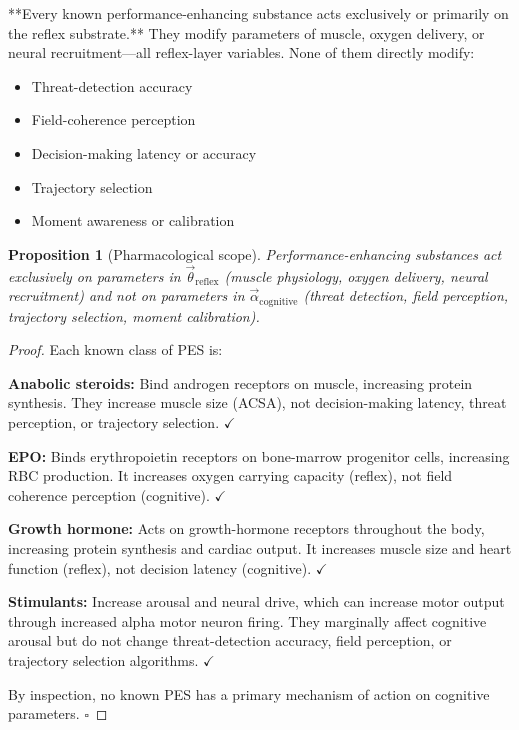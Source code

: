 \documentclass[11pt,twocolumn]{article}
\newtheorem{proposition}[theorem]{Proposition}
\theoremstyle{definition}
\theoremstyle{remark}
\begin{document}
**Every known performance-enhancing substance acts exclusively or primarily on the reflex substrate.** They modify parameters of muscle, oxygen delivery, or neural recruitment—all reflex-layer variables. None of them directly modify:
\begin{itemize}[leftmargin=1.2em]
\item Threat-detection accuracy
\item Field-coherence perception
\item Decision-making latency or accuracy
\item Trajectory selection
\item Moment awareness or calibration
\end{itemize}

\begin{proposition}[Pharmacological scope]
\label{prop:pharm-scope}
Performance-enhancing substances act exclusively on parameters in $\vec{\theta}_{\text{reflex}}$ (muscle physiology, oxygen delivery, neural recruitment) and not on parameters in $\vec{\alpha}_{\text{cognitive}}$ (threat detection, field perception, trajectory selection, moment calibration).
\end{proposition}

\begin{proof}
Each known class of PES is:

\textbf{Anabolic steroids:} Bind androgen receptors on muscle, increasing protein synthesis. They increase muscle size (ACSA), not decision-making latency, threat perception, or trajectory selection. $\checkmark$

\textbf{EPO:} Binds erythropoietin receptors on bone-marrow progenitor cells, increasing RBC production. It increases oxygen carrying capacity (reflex), not field coherence perception (cognitive). $\checkmark$

\textbf{Growth hormone:} Acts on growth-hormone receptors throughout the body, increasing protein synthesis and cardiac output. It increases muscle size and heart function (reflex), not decision latency (cognitive). $\checkmark$

\textbf{Stimulants:} Increase arousal and neural drive, which can increase motor output through increased alpha motor neuron firing. They marginally affect cognitive arousal but do not change threat-detection accuracy, field perception, or trajectory selection algorithms. $\checkmark$

By inspection, no known PES has a primary mechanism of action on cognitive parameters. $\square$
\end{proof}
\end{document}
